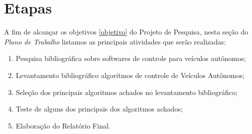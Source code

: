 \documentclass{article}
\begin{document}
\section{Etapas} \label{etapas}
A fim de alcançar os objetivos \ref{objetivo} do Projeto de Pesquisa, nesta seção do \textit{Plano de Trabalho} listamos as principais atividades que serão realizadas:


\begin{enumerate}
    \item Pesquisa bibliográfica sobre softwares de controle para veículos autônomos;
    \item Levantamento bibliográfico algoritmos de controle de Veículos Autônomos;
    \item Seleção dos principais algoritmos achados no levantamento bibliográfico;
    \item Teste de alguns dos principais dos algoritmos achados;
    \item Elaboração do Relatório Final.
\end{enumerate}
\end{document}

